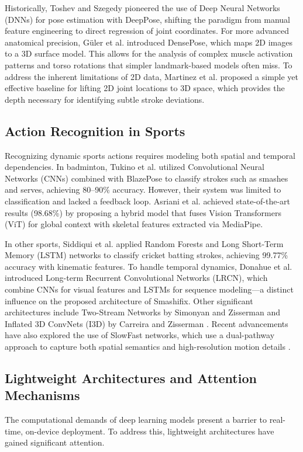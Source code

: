 \documentclass[pdflatex,sn-mathphys-num]{sn-jnl}
\theoremstyle{thmstyleone}%
\theoremstyle{thmstyletwo}%
\theoremstyle{thmstylethree}%
\begin{document}
Historically, Toshev and Szegedy \cite{b14} pioneered the use of Deep Neural Networks (DNNs) for pose estimation with DeepPose, shifting the paradigm from manual feature engineering to direct regression of joint coordinates. For more advanced anatomical precision, G\"uler et al. \cite{b15} introduced DensePose, which maps 2D images to a 3D surface model. This allows for the analysis of complex muscle activation patterns and torso rotations that simpler landmark-based models often miss. To address the inherent limitations of 2D data, Martinez et al. \cite{b16} proposed a simple yet effective baseline for lifting 2D joint locations to 3D space, which provides the depth necessary for identifying subtle stroke deviations.

\subsection{Action Recognition in Sports}
Recognizing dynamic sports actions requires modeling both spatial and temporal dependencies. In badminton, Tukino et al. \cite{b17} utilized Convolutional Neural Networks (CNNs) combined with BlazePose to classify strokes such as smashes and serves, achieving 80--90\% accuracy. However, their system was limited to classification and lacked a feedback loop. Asriani et al. \cite{b18} achieved state-of-the-art results (98.68\%) by proposing a hybrid model that fuses Vision Transformers (ViT) for global context with skeletal features extracted via MediaPipe.

In other sports, Siddiqui et al. \cite{b19} applied Random Forests and Long Short-Term Memory (LSTM) networks to classify cricket batting strokes, achieving 99.77\% accuracy with kinematic features. To handle temporal dynamics, Donahue et al. \cite{b20} introduced Long-term Recurrent Convolutional Networks (LRCN), which combine CNNs for visual features and LSTMs for sequence modeling---a distinct influence on the proposed architecture of Smashifix. Other significant architectures include Two-Stream Networks by Simonyan and Zisserman \cite{b21} and Inflated 3D ConvNets (I3D) by Carreira and Zisserman \cite{b22}. Recent advancements have also explored the use of SlowFast networks, which use a dual-pathway approach to capture both spatial semantics and high-resolution motion details \cite{b23}.

\subsection{Lightweight Architectures and Attention Mechanisms}
The computational demands of deep learning models present a barrier to real-time, on-device deployment. To address this, lightweight architectures have gained significant attention.
\end{document}
